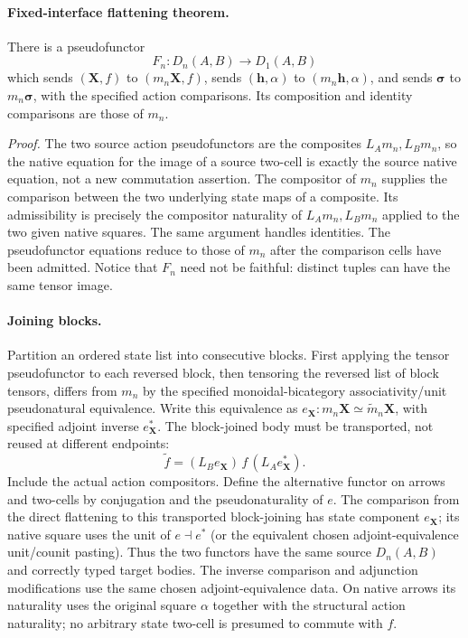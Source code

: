 \documentclass{article}
\begin{document}
\paragraph{Fixed-interface flattening theorem.} There is a pseudofunctor
\[
 F_n:D_n(A,B)\longrightarrow D_1(A,B)
\]
which sends $(\mathbf X,f)$ to $(m_n\mathbf X,f)$, sends $(\mathbf h,\alpha)$ to $(m_n\mathbf h,\alpha)$, and sends $\boldsymbol\sigma$ to $m_n\boldsymbol\sigma$, with the specified action comparisons. Its composition and identity comparisons are those of $m_n$.

\emph{Proof.} The two source action pseudofunctors are the composites $L_A m_n,L_B m_n$, so the native equation for the image of a source two-cell is exactly the source native equation, not a new commutation assertion. The compositor of $m_n$ supplies the comparison between the two underlying state maps of a composite. Its admissibility is precisely the compositor naturality of $L_A m_n,L_B m_n$ applied to the two given native squares. The same argument handles identities. The pseudofunctor equations reduce to those of $m_n$ after the comparison cells have been admitted. Notice that $F_n$ need not be faithful: distinct tuples can have the same tensor image.

\paragraph{Joining blocks.} Partition an ordered state list into consecutive blocks. First applying the tensor pseudofunctor to each reversed block, then tensoring the reversed list of block tensors, differs from $m_n$ by the specified monoidal-bicategory associativity/unit pseudonatural equivalence. Write this equivalence as $e_{\mathbf X}:m_n\mathbf X\simeq\widetilde m_n\mathbf X$, with specified adjoint inverse $e_{\mathbf X}^*$. The block-joined body must be transported, not reused at different endpoints:
\[
 \widetilde f=(L_Be_{\mathbf X})\,f\,(L_Ae_{\mathbf X}^*).
\]
Include the actual action compositors. Define the alternative functor on arrows and two-cells by conjugation and the pseudonaturality of $e$. The comparison from the direct flattening to this transported block-joining has state component $e_{\mathbf X}$; its native square uses the unit of $e\dashv e^*$ (or the equivalent chosen adjoint-equivalence unit/counit pasting). Thus the two functors have the same source $D_n(A,B)$ and correctly typed target bodies. The inverse comparison and adjunction modifications use the same chosen adjoint-equivalence data. On native arrows its naturality uses the original square $\alpha$ together with the structural action naturality; no arbitrary state two-cell is presumed to commute with $f$.
\end{document}
